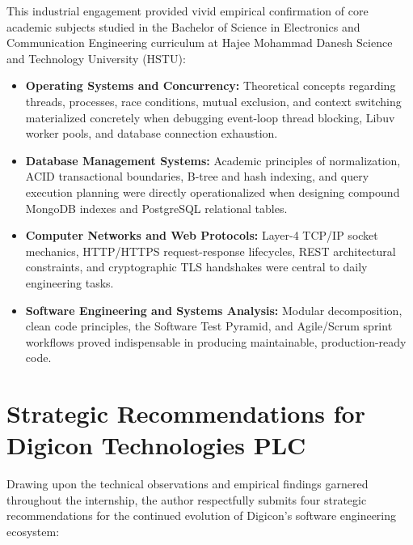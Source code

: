 This industrial engagement provided vivid empirical confirmation of core academic subjects studied in the Bachelor of Science in Electronics and Communication Engineering curriculum at Hajee Mohammad Danesh Science and Technology University (HSTU):

\begin{itemize}
    \item \textbf{Operating Systems and Concurrency:} Theoretical concepts regarding threads, processes, race conditions, mutual exclusion, and context switching materialized concretely when debugging event-loop thread blocking, Libuv worker pools, and database connection exhaustion.
    \item \textbf{Database Management Systems:} Academic principles of normalization, ACID transactional boundaries, B-tree and hash indexing, and query execution planning were directly operationalized when designing compound MongoDB indexes and PostgreSQL relational tables.
    \item \textbf{Computer Networks and Web Protocols:} Layer-4 TCP/IP socket mechanics, HTTP/HTTPS request-response lifecycles, REST architectural constraints, and cryptographic TLS handshakes were central to daily engineering tasks.
    \item \textbf{Software Engineering and Systems Analysis:} Modular decomposition, clean code principles, the Software Test Pyramid, and Agile/Scrum sprint workflows proved indispensable in producing maintainable, production-ready code.
\end{itemize}

\section{Strategic Recommendations for Digicon Technologies PLC}
\label{sec:conclusion_recommendations}

Drawing upon the technical observations and empirical findings garnered throughout the internship, the author respectfully submits four strategic recommendations for the continued evolution of Digicon's software engineering ecosystem:

